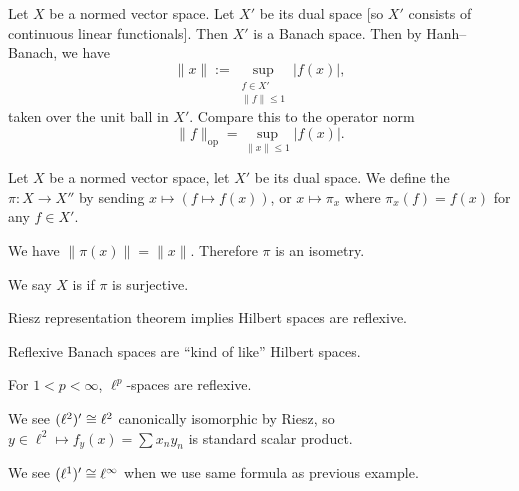 \begin{node}
Let $X$ be a normed vector space. Let $X'$ be its dual space [so $X'$
  consists of continuous linear functionals].
Then $X'$ is a Banach space. Then by Hanh--Banach, we have 
\begin{equation}
\|x\|:=\sup_{\substack{f\in X'\\ \|f\|\leq1}}|f(x)|,
\end{equation}
taken over the unit ball in $X'$. Compare this to the operator norm
\begin{equation}
\|f\|_{\text{op}}=\sup_{\|x\|\leq1}|f(x)|.
\end{equation}
\end{node}

\begin{definition}
Let $X$ be a normed vector space, let $X'$ be its dual space.
We define the  $\pi\colon X\to X''$
by sending $x\mapsto(f\mapsto f(x))$, or $x\mapsto \pi_{x}$ where
$\pi_{x}(f)=f(x)$ for any $f\in X'$.
\end{definition}

\begin{corollary}
We have $\|\pi(x)\|=\|x\|$. Therefore $\pi$ is an isometry.
\end{corollary}

\begin{definition}
We say $X$ is  if $\pi$ is surjective.
\end{definition}

\begin{example}
Riesz representation theorem implies Hilbert spaces are reflexive.
\end{example}

\begin{node}
Reflexive Banach spaces are ``kind of like'' Hilbert spaces.
\end{node}

\begin{example}
For $1<p<\infty$, $\ell^{p}$-spaces are reflexive.
\end{example}


\begin{example}
We see $(\ell^{2})'\cong\ell^{2}$ canonically isomorphic by Riesz, so
$y\in\ell^{2}\mapsto f_{y}(x)=\sum x_{n}y_{n}$ is standard scalar product.
\end{example}

\begin{example}
We see $(\ell^{1})'\cong\ell^{\infty}$ when we use same formula as
previous example.
\end{example}

